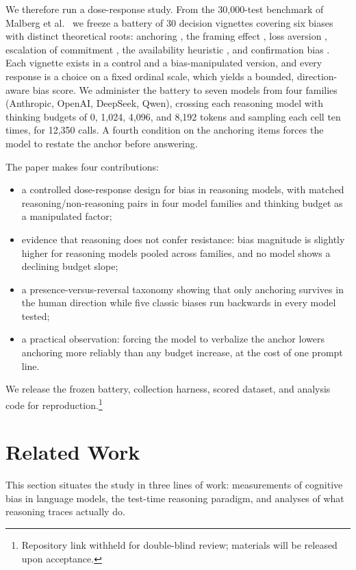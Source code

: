 \documentclass[conference]{IEEEtran}
\begin{document}
We therefore run a dose-response study. From the 30,000-test benchmark of Malberg et al.~\cite{malberg2024comprehensive} we freeze a battery of 30 decision vignettes covering six biases with distinct theoretical roots: anchoring \cite{tversky1974judgment}, the framing effect \cite{tversky1981framing}, loss aversion \cite{kahneman1979prospect}, escalation of commitment \cite{staw1976kneedeep}, the availability heuristic \cite{tversky1973availability}, and confirmation bias \cite{nickerson1998confirmation}. Each vignette exists in a control and a bias-manipulated version, and every response is a choice on a fixed ordinal scale, which yields a bounded, direction-aware bias score. We administer the battery to seven models from four families (Anthropic, OpenAI, DeepSeek, Qwen), crossing each reasoning model with thinking budgets of 0, 1,024, 4,096, and 8,192 tokens and sampling each cell ten times, for 12,350 calls. A fourth condition on the anchoring items forces the model to restate the anchor before answering.

The paper makes four contributions:
\begin{itemize}
\item a controlled dose-response design for bias in reasoning models, with matched reasoning/non-reasoning pairs in four model families and thinking budget as a manipulated factor;
\item evidence that reasoning does not confer resistance: bias magnitude is slightly higher for reasoning models pooled across families, and no model shows a declining budget slope;
\item a presence-versus-reversal taxonomy showing that only anchoring survives in the human direction while five classic biases run backwards in every model tested;
\item a practical observation: forcing the model to verbalize the anchor lowers anchoring more reliably than any budget increase, at the cost of one prompt line.
\end{itemize}
We release the frozen battery, collection harness, scored dataset, and analysis code for reproduction.\footnote{Repository link withheld for double-blind review; materials will be released upon acceptance.}

\section{Related Work}

This section situates the study in three lines of work: measurements of cognitive bias in language models, the test-time reasoning paradigm, and analyses of what reasoning traces actually do.
\end{document}
